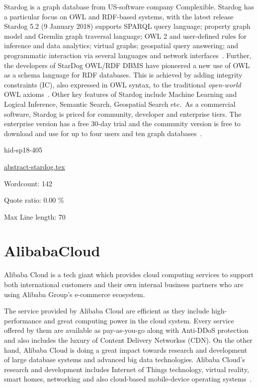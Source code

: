 Stardog is a graph database from US-software company
Complexible. Stardog has a particular focus on OWL and RDF-based
systems, with the latest release Stardog 5.2 (9 January 2018) supports
SPARQL query language; property graph model and Gremlin graph
traversal language; OWL 2 and user-defined rules for inference and
data analytics; virtual graphs; geospatial query answering; and
programmatic interaction via several languages and network
interfaces~\cite{hid-sp18-405-wwwdocs-stardog}. Further, the
developers of StarDog OWL/RDF DBMS have pioneered a new use of OWL as
a schema language for RDF databases. This is achieved by adding
integrity constraints (IC), also expressed in OWL syntax, to the
traditional \textit{open-world} OWL
axioms~\cite{hid-sp18-405-cer2012graphical-stardog}. Other key
features of Stardog include Machine Learning and Logical Inference,
Semantic Search, Geospatial Search etc.\ As a commercial software,
Stardog is priced for community, developer and enterprise tiers. The
enterprise version has a free 30-day trial and the community version
is free to download and use for up to four users and ten graph
databases~\cite{hid-sp18-405-www-stardog}.





\begin{IU}

hid-sp18-405

\href{https://github.com/cloudmesh-community/hid-sp18-405/blob/master//technology/abstract-stardog.tex}{abstract-stardog.tex}

 

Wordcount: 142


Quote ratio: 0.00 \%
 
Max Line length: 70
\end{IU}

\section{AlibabaCloud}

Alibaba Cloud is a tech giant which provides cloud computing services to support
both international customers and their own internal business partners who are
using Alibaba Group's e-commerce ecosystem.


The service provided by Alibaba Cloud are efficient as they include
high-performance and great computing power in the cloud system. Every service
offered by them are available as pay-as-you-go along with Anti-DDoS protection
and also includes the luxury of Content Delivery Networkss (CDN). On the other
hand, Alibaba Cloud is doing a great impact towards research and development of
large database systems and advanced big data technologies. Alibaba Cloud's
research and development includes Internet of Things technology, virtual
reality, smart homes, networking and also cloud-based mobile-device
operating systems~\cite{hid-sp18-406-AlibabaCloud}.



